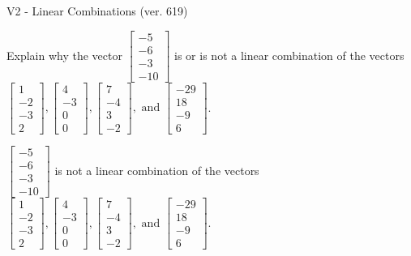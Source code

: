 \begin{exercise}
  \begin{exerciseTitle}V2 - Linear Combinations (ver. 619)\end{exerciseTitle}
  \begin{exerciseStatement}
    Explain why the vector \(\left[\begin{array}{c}
-5 \\
-6 \\
-3 \\
-10
\end{array}\right]\)  is or is not a linear 
	combination of the vectors \(\left[\begin{array}{c}
1 \\
-2 \\
-3 \\
2
\end{array}\right] , \left[\begin{array}{c}
4 \\
-3 \\
0 \\
0
\end{array}\right] , \left[\begin{array}{c}
7 \\
-4 \\
3 \\
-2
\end{array}\right] , \text{ and } \left[\begin{array}{c}
-29 \\
18 \\
-9 \\
6
\end{array}\right]\).
	


  \end{exerciseStatement}
  \begin{exerciseAnswer}
   \(\left[\begin{array}{c}
-5 \\
-6 \\
-3 \\
-10
\end{array}\right]\) 
  	 is not  
	a linear combination of the vectors \(\left[\begin{array}{c}
1 \\
-2 \\
-3 \\
2
\end{array}\right] , \left[\begin{array}{c}
4 \\
-3 \\
0 \\
0
\end{array}\right] , \left[\begin{array}{c}
7 \\
-4 \\
3 \\
-2
\end{array}\right] , \text{ and } \left[\begin{array}{c}
-29 \\
18 \\
-9 \\
6
\end{array}\right]\).


\end{exerciseAnswer}
\end{exercise}
